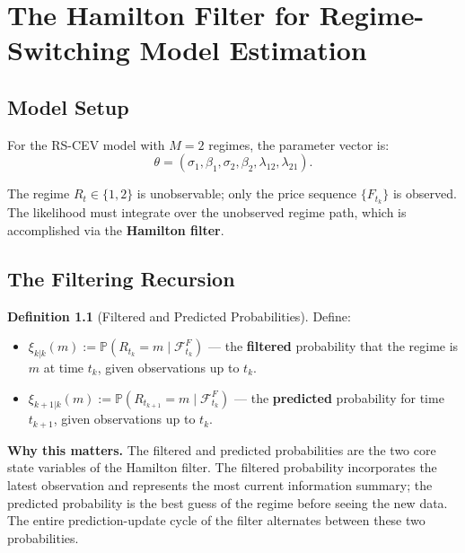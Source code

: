 \documentclass[11pt,a4paper,openany]{book}
\theoremstyle{definition}
\newtheorem{definition}{Definition}[chapter]
\theoremstyle{plain}
\theoremstyle{remark}
\newcommand{\1}{\mathbbm{1}}
\newcommand{\F}{\mathcal{F}}
\newcommand{\Pbb}{\mathbb{P}}
\begin{document}
\chapter{The Hamilton Filter for Regime-Switching Model Estimation}

\section{Model Setup}

For the RS-CEV model with $M = 2$ regimes, the parameter vector is:
\[
\theta = (\sigma_{1}, \beta_{1}, \sigma_{2}, \beta_{2}, \lambda_{12}, \lambda_{21}).
\]

The regime $R_{t} \in \{1, 2\}$ is unobservable; only the price sequence $\{F_{t_{k}}\}$ is observed. The likelihood must integrate over the unobserved regime path, which is accomplished via the \textbf{Hamilton filter}.

\section{The Filtering Recursion}

\begin{definition}[Filtered and Predicted Probabilities]
Define:
\begin{itemize}
    \item $\xi_{k|k}(m) := \Pbb(R_{t_{k}} = m \mid \F_{t_{k}}^{F})$ — the \textbf{filtered} probability that the regime is $m$ at time $t_{k}$, given observations up to $t_{k}$.
    \item $\xi_{k+1|k}(m) := \Pbb(R_{t_{k+1}} = m \mid \F_{t_{k}}^{F})$ — the \textbf{predicted} probability for time $t_{k+1}$, given observations up to $t_{k}$.
\end{itemize}
\end{definition}

\medskip
\noindent\textbf{Why this matters.} The filtered and predicted probabilities are the two core state variables of the Hamilton filter. The filtered probability incorporates the latest observation and represents the most current information summary; the predicted probability is the best guess of the regime before seeing the new data. The entire prediction-update cycle of the filter alternates between these two probabilities.
\end{document}
